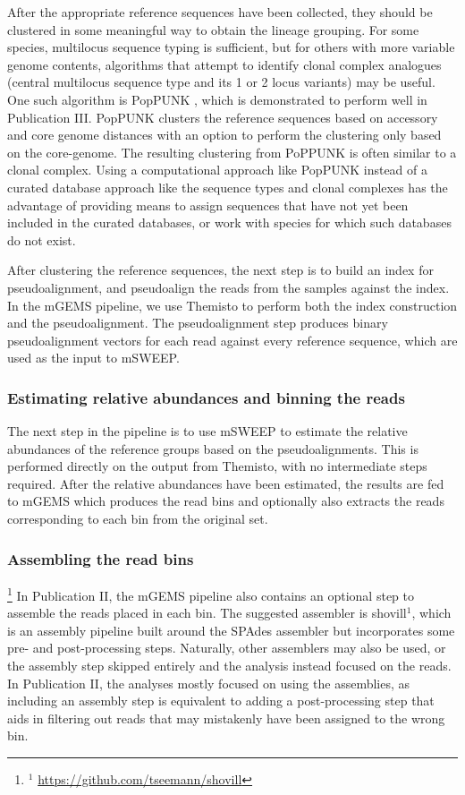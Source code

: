 \documentclass[officiallayout]{tktla}
\begin{document}
After the appropriate reference sequences have been collected, they
should be clustered in some meaningful way to obtain the lineage
grouping. For some species, multilocus sequence typing is sufficient,
but for others with more variable genome contents, algorithms that
attempt to identify clonal complex analogues (central multilocus
sequence type and its 1 or 2 locus variants) may be useful. One such
algorithm is PopPUNK \citep{lees2019fast}, which is demonstrated to
perform well in Publication III. PopPUNK clusters the
reference sequences based on accessory and core genome distances with
an option to perform the clustering only based on the core-genome. The
resulting clustering from PoPPUNK is often similar to a clonal
complex. Using a computational approach like PopPUNK instead of a curated
database approach like the sequence types and clonal complexes has the
advantage of providing means to assign sequences that have not yet
been included in the curated databases, or work with species for which
such databases do not exist.

After clustering the reference sequences, the next step is to build an
index for pseudoalignment, and pseudoalign the reads from the samples
against the index. In the mGEMS pipeline, we use Themisto
\citep{maklin_bacterial_2021} to perform both the index construction
and the pseudoalignment. The pseudoalignment step produces binary
pseudoalignment vectors for each read against every reference
sequence, which are used as the input to mSWEEP.

\subsubsection{Estimating relative abundances and binning the reads}

The next step in the pipeline is to use mSWEEP to estimate the
relative abundances of the reference groups based on the
pseudoalignments. This is performed directly on the output from
Themisto, with no intermediate steps required. After the relative
abundances have been estimated, the results are fed to mGEMS which
produces the read bins and optionally also extracts the reads
corresponding to each bin from the original set.

\subsubsection{Assembling the read bins}

\noindent\let\thefootnote\relax\footnote{$^{1}$ \url{https://github.com/tseemann/shovill}}
In Publication II, the mGEMS pipeline also contains an optional step
to assemble the reads placed in each bin. The suggested assembler is
shovill$^{1}$, which is an assembly pipeline built around the SPAdes
assembler \citep{prjibelski2020using} but incorporates some pre- and
post-processing steps. Naturally, other assemblers may also be used,
or the assembly step skipped entirely and the analysis instead focused
on the reads. In Publication II, the analyses mostly focused on using
the assemblies, as including an assembly step is equivalent to adding
a post-processing step that aids in filtering out reads that may
mistakenly have been assigned to the wrong bin.
\end{document}
